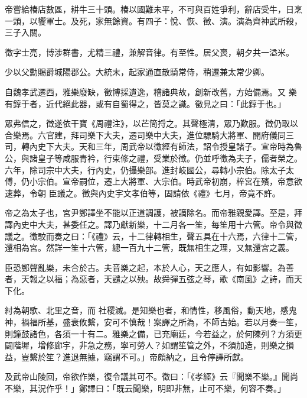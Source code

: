\begin{pinyinscope}
 帝嘗給椿店數區，耕牛三十頭。椿以國難未平，不可與百姓爭利，辭店受牛，日烹一頭，以饗軍士。及死，家無餘資。有四子：悅、恢、徵、演。演為齊神武所殺，三子入關。



 徵字士亮，博涉群書，尤精三禮，兼解音律。有至性。居父喪，朝夕共一溢米。



 少以父勳賜爵城陽郡公。大統末，起家通直散騎常侍，稍遷兼太常少卿。



 自魏孝武遷西，雅樂廢缺，徵博採遺逸，稽諸典故，創新改舊，方始備焉。又
 樂有錞于者，近代絕此器，或有自蜀得之，皆莫之識。徵見之曰：「此錞于也。」



 眾弗信之，徵遂依干寶《周禮注》，以芒筒捋之。其聲極清，眾乃歎服。徵仍取以合樂焉。六官建，拜司樂下大夫，遷司樂中大夫，進位驃騎大將軍、開府儀同三司，轉內史下大夫。天和三年，周武帝以徵經有師法，詔令授皇諸子。宣帝時為魯公，與諸皇子等咸服青衿，行束修之禮，受業於徵。仍並呼徵為夫子，儒者榮之。六年，除司宗中大夫，行內史，仍攝樂部。進封岐國公，尋轉小宗伯。除太子太傅，仍小宗伯。宣帝嗣位，遷上大將軍、大宗伯。時武帝初崩，梓宮在殯，帝意欲速葬，令朝
 臣議之。徵與內史宇文孝伯等，固請依《禮》七月，帝竟不許。



 帝之為太子也，宮尹鄭譯坐不能以正道調護，被謫除名。而帝雅親愛譯。至是，拜譯內史中大夫，甚委任之。譯乃獻新樂，十二月各一笙，每笙用十六管。帝令與徵議之。徵駮而奏之曰：「《禮》云，十二律轉相生，聲五具在十六焉，六律十二管，還相為宮。然詳一笙十六管，總一百九十二管，既無相生之理，又無還宮之義。



 臣恐鄭聲亂樂，未合於古。夫音樂之起，本於人心，天之應人，有如影響。為善者，天報之以福；為惡者，天譴之以殃。故舜彈五弦之琴，歌《南風》之詩，而天下化。



 紂為朝歌、北里之音，而
 社稷滅。是知樂也者，和情性，移風俗，動天地，感鬼神，禍福所基，盛衰攸繫，安可不慎哉！案譯之所為，不師古始。若以月奏一笙，則鐘鼓諸色，各須一十有二。雅樂之備，已充廟廷，今若益之，於何陳列？方須更闢階墀，增修廊宇，非急之務，寧可勞人？如謂笙管之外，不須加造，則樂之損益，豈繫於笙？進退無據，竊謂不可。」帝頗納之，且令停譯所獻。



 及武帝山陵回，帝欲作樂，復令議其可不。徵曰：「《孝經》云『聞樂不樂。』聞尚不樂，其況作乎！」鄭譯曰：「既云聞樂，明即非無，止可不樂，何容不奏。」




\end{pinyinscope}
